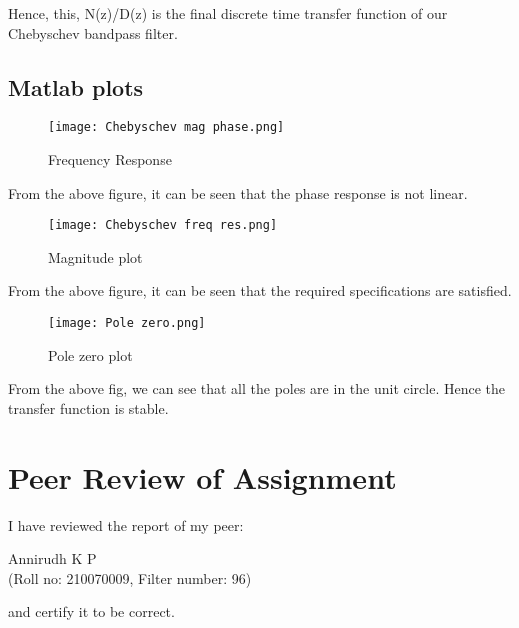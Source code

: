 \documentclass{article}
\begin{document}
Hence, this, N(z)/D(z) is the final discrete time transfer function of our Chebyschev bandpass filter.

\subsection{Matlab plots}

\begin{figure}[h!]

\centering
\texttt{[image: Chebyschev mag phase.png]}
\caption{Frequency Response}
\end{figure}

From the above figure, it can be seen that the phase response is not linear.
\clearpage

\begin{figure}[h!]

\centering
\texttt{[image: Chebyschev freq res.png]}
\caption{Magnitude plot}
\end{figure}

From the above figure, it can be seen that the required specifications are satisfied.

\begin{figure}[h!]

\centering
\texttt{[image: Pole zero.png]}
\caption{Pole zero plot}
\end{figure}

From the above fig, we can see that all the poles are in the unit circle. Hence the transfer function is stable.

\section{Peer Review of Assignment}

I have reviewed the report of my peer:

\begin{center}
    Annirudh K P\\
    (Roll no: 210070009, Filter number: 96)
\end{center}
and certify it to be correct.
\end{document}
